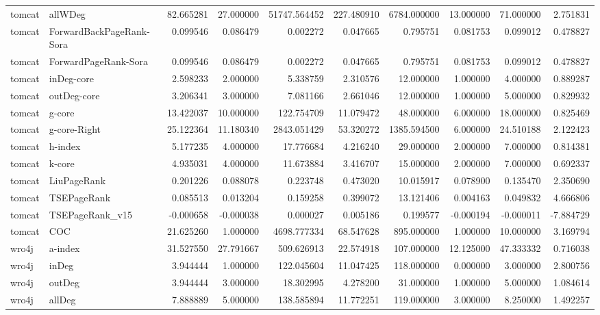 \begin{tabular}{llrrrrrrrr}
tomcat & allWDeg & 82.665281 & 27.000000 & 51747.564452 & 227.480910 & 6784.000000 & 13.000000 & 71.000000 & 2.751831 \\
tomcat & ForwardBackPageRank-Sora & 0.099546 & 0.086479 & 0.002272 & 0.047665 & 0.795751 & 0.081753 & 0.099012 & 0.478827 \\
tomcat & ForwardPageRank-Sora & 0.099546 & 0.086479 & 0.002272 & 0.047665 & 0.795751 & 0.081753 & 0.099012 & 0.478827 \\
tomcat & inDeg-core & 2.598233 & 2.000000 & 5.338759 & 2.310576 & 12.000000 & 1.000000 & 4.000000 & 0.889287 \\
tomcat & outDeg-core & 3.206341 & 3.000000 & 7.081166 & 2.661046 & 12.000000 & 1.000000 & 5.000000 & 0.829932 \\
tomcat & g-core & 13.422037 & 10.000000 & 122.754709 & 11.079472 & 48.000000 & 6.000000 & 18.000000 & 0.825469 \\
tomcat & g-core-Right & 25.122364 & 11.180340 & 2843.051429 & 53.320272 & 1385.594500 & 6.000000 & 24.510188 & 2.122423 \\
tomcat & h-index & 5.177235 & 4.000000 & 17.776684 & 4.216240 & 29.000000 & 2.000000 & 7.000000 & 0.814381 \\
tomcat & k-core & 4.935031 & 4.000000 & 11.673884 & 3.416707 & 15.000000 & 2.000000 & 7.000000 & 0.692337 \\
tomcat & LiuPageRank & 0.201226 & 0.088078 & 0.223748 & 0.473020 & 10.015917 & 0.078900 & 0.135470 & 2.350690 \\
tomcat & TSEPageRank & 0.085513 & 0.013204 & 0.159258 & 0.399072 & 13.121406 & 0.004163 & 0.049832 & 4.666806 \\
tomcat & TSEPageRank_v15 & -0.000658 & -0.000038 & 0.000027 & 0.005186 & 0.199577 & -0.000194 & -0.000011 & -7.884729 \\
tomcat & COC & 21.625260 & 1.000000 & 4698.777334 & 68.547628 & 895.000000 & 1.000000 & 10.000000 & 3.169794 \\
wro4j & a-index & 31.527550 & 27.791667 & 509.626913 & 22.574918 & 107.000000 & 12.125000 & 47.333332 & 0.716038 \\
wro4j & inDeg & 3.944444 & 1.000000 & 122.045604 & 11.047425 & 118.000000 & 0.000000 & 3.000000 & 2.800756 \\
wro4j & outDeg & 3.944444 & 3.000000 & 18.302995 & 4.278200 & 31.000000 & 1.000000 & 5.000000 & 1.084614 \\
wro4j & allDeg & 7.888889 & 5.000000 & 138.585894 & 11.772251 & 119.000000 & 3.000000 & 8.250000 & 1.492257 \\

\end{tabular}

